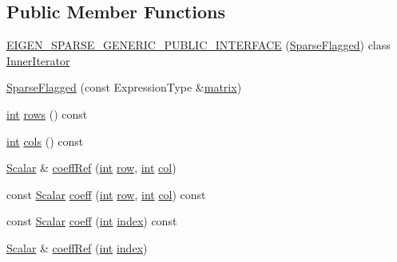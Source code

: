 \subsection*{Public Member Functions}
\begin{DoxyCompactItemize}
\item 
\hyperlink{class_sparse_flagged_a46cc587e68cf926647730f24fc30d45b}{E\-I\-G\-E\-N\-\_\-\-S\-P\-A\-R\-S\-E\-\_\-\-G\-E\-N\-E\-R\-I\-C\-\_\-\-P\-U\-B\-L\-I\-C\-\_\-\-I\-N\-T\-E\-R\-F\-A\-C\-E} (\hyperlink{class_sparse_flagged}{Sparse\-Flagged}) class \hyperlink{class_sparse_flagged_1_1_inner_iterator}{Inner\-Iterator}
\item 
\hyperlink{class_sparse_flagged_af52667b09f02ee76555bbcc9c7abc4ea}{Sparse\-Flagged} (const Expression\-Type \&\hyperlink{glext_8h_a7b24a3f2f56eb1244ae69dacb4fecb6f}{matrix})
\item 
\hyperlink{ioapi_8h_a787fa3cf048117ba7123753c1e74fcd6}{int} \hyperlink{class_sparse_flagged_a874891d60e4c9b4b4d48b4b36df2baff}{rows} () const 
\item 
\hyperlink{ioapi_8h_a787fa3cf048117ba7123753c1e74fcd6}{int} \hyperlink{class_sparse_flagged_a10c92400d06699e11cdb13a79222321c}{cols} () const 
\item 
\hyperlink{class_sparse_matrix_base_af39d70f2b7e775e9e17b666cd24128c8}{Scalar} \& \hyperlink{class_sparse_flagged_ab5a3bbf327fd3773532c009f7d26fcc7}{coeff\-Ref} (\hyperlink{ioapi_8h_a787fa3cf048117ba7123753c1e74fcd6}{int} \hyperlink{glext_8h_a11b277b422822f784ee248b43eee3e1e}{row}, \hyperlink{ioapi_8h_a787fa3cf048117ba7123753c1e74fcd6}{int} \hyperlink{class_sparse_matrix_base_a711a8f11f5f1915057922412dac2cc25}{col})
\item 
const \hyperlink{class_sparse_matrix_base_af39d70f2b7e775e9e17b666cd24128c8}{Scalar} \hyperlink{class_sparse_flagged_a9dafca7b13f1a5bb14c6a79f37900bd0}{coeff} (\hyperlink{ioapi_8h_a787fa3cf048117ba7123753c1e74fcd6}{int} \hyperlink{glext_8h_a11b277b422822f784ee248b43eee3e1e}{row}, \hyperlink{ioapi_8h_a787fa3cf048117ba7123753c1e74fcd6}{int} \hyperlink{class_sparse_matrix_base_a711a8f11f5f1915057922412dac2cc25}{col}) const 
\item 
const \hyperlink{class_sparse_matrix_base_af39d70f2b7e775e9e17b666cd24128c8}{Scalar} \hyperlink{class_sparse_flagged_a277e7bc8a1ed76f3d3380ba2df858f74}{coeff} (\hyperlink{ioapi_8h_a787fa3cf048117ba7123753c1e74fcd6}{int} \hyperlink{glext_8h_ab47dd9958bcadea08866b42bf358e95e}{index}) const 
\item 
\hyperlink{class_sparse_matrix_base_af39d70f2b7e775e9e17b666cd24128c8}{Scalar} \& \hyperlink{class_sparse_flagged_abefbd621adaa029b665e1ef98e95eedf}{coeff\-Ref} (\hyperlink{ioapi_8h_a787fa3cf048117ba7123753c1e74fcd6}{int} \hyperlink{glext_8h_ab47dd9958bcadea08866b42bf358e95e}{index})
\end{DoxyCompactItemize}
